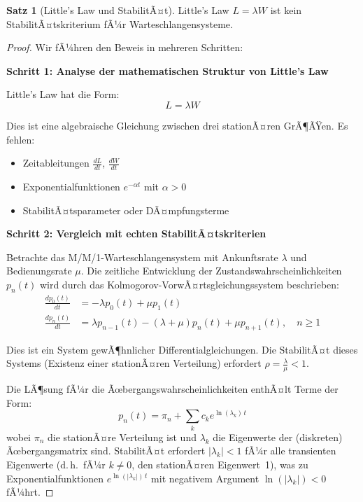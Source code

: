 ﻿\documentclass[a4paper,12pt]{report}
\theoremstyle{definition}
\newtheorem{satz}{Satz}[section]
\begin{document}
\begin{satz}[Little's Law und StabilitÃ¤t]
	Little's Law $L = \lambda W$ ist kein StabilitÃ¤tskriterium fÃ¼r Warteschlangensysteme.
\end{satz}

\begin{proof}
	Wir fÃ¼hren den Beweis in mehreren Schritten:
	
	\textbf{Schritt 1: Analyse der mathematischen Struktur von Little's Law}
	
	Little's Law hat die Form:
	\begin{equation}
		L = \lambda W
	\end{equation}
	
	Dies ist eine algebraische Gleichung zwischen drei stationÃ¤ren GrÃ¶ÃŸen. Es fehlen:
	\begin{itemize}
		\item[-] Zeitableitungen $\frac{dL}{dt}$, $\frac{dW}{dt}$
		\item[-] Exponentialfunktionen $e^{-\alpha t}$ mit $\alpha > 0$
		\item[-] StabilitÃ¤tsparameter oder DÃ¤mpfungsterme
	\end{itemize}
	
	\textbf{Schritt 2: Vergleich mit echten StabilitÃ¤tskriterien}
	
	Betrachte das M/M/1-Warteschlangensystem mit Ankunftsrate $\lambda$ und Bedienungsrate $\mu$. Die zeitliche Entwicklung der Zustandswahrscheinlichkeiten $p_n(t)$ wird durch das Kolmogorov-VorwÃ¤rtsgleichungssystem beschrieben:
	\begin{align}
		\frac{dp_0(t)}{dt} &= -\lambda p_0(t) + \mu p_1(t) \\
		\frac{dp_n(t)}{dt} &= \lambda p_{n-1}(t) - (\lambda + \mu) p_n(t) + \mu p_{n+1}(t), \quad n \geq 1
	\end{align}
	
	Dies ist ein System gewÃ¶hnlicher Differentialgleichungen. Die StabilitÃ¤t dieses Systems (Existenz einer stationÃ¤ren Verteilung) erfordert $\rho = \frac{\lambda}{\mu} < 1$.
	
	Die LÃ¶sung fÃ¼r die Ãœbergangswahrscheinlichkeiten enthÃ¤lt Terme der Form:
	\begin{equation}
		p_n(t) = \pi_n + \sum_{k} c_k e^{\ln(\lambda_k)\,t}
	\end{equation}
	wobei $\pi_n$ die stationÃ¤re Verteilung ist und $\lambda_k$ die Eigenwerte
	der (diskreten) Ãœbergangsmatrix sind.  StabilitÃ¤t erfordert $|\lambda_k| < 1$
	fÃ¼r alle transienten Eigenwerte (d.\,h.\ fÃ¼r $k \neq 0$, den stationÃ¤ren
	Eigenwert~1), was zu Exponentialfunktionen $e^{\ln(|\lambda_k|)\,t}$ mit
	negativem Argument $\ln(|\lambda_k|) < 0$ fÃ¼hrt.
	

\end{proof}
\end{document}
